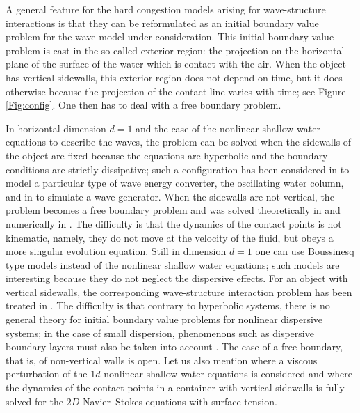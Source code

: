 \documentclass[11pt]{article}
\theoremstyle{definition}
\begin{document}
A general feature for the hard congestion models arising for wave-structure interactions is that
they can be reformulated as an initial boundary value problem for the wave model under consideration.
This initial boundary value problem is cast in the so-called exterior region:
the projection on the horizontal plane of the surface of the water which is contact with the air.
When the object has vertical sidewalls, this exterior region does not depend on time,
but it does otherwise because the projection of the contact line varies with time; see Figure \ref{Fig:config}.
One then has to deal with a free boundary problem.

In horizontal dimension $d=1$ and the case of the nonlinear shallow water equations to describe the waves,
the problem can be solved when the sidewalls of the object are fixed because the equations are hyperbolic and the boundary conditions are strictly dissipative;
such a configuration has been considered in \cite{BocchiHeVergara} to model a particular type of wave energy converter, the oscillating water column,
and in \cite{SuTucsnak} to simulate a wave generator.
When the sidewalls are not vertical,
the problem becomes a free boundary problem and was solved theoretically in \cite{IguchiLannes2021} and numerically in \cite{HaidarMarcheVilar}.
The difficulty is that the dynamics of the contact points is not kinematic, namely, they do not move at the velocity of the fluid,
but obeys a more singular evolution equation.
Still in dimension $d=1$ one can use Boussinesq type models instead of the nonlinear shallow water equations;
such models are interesting because they do not neglect the dispersive effects.
For an object with vertical sidewalls,
the corresponding wave-structure interaction problem has been treated in \cite{BreschLannesMetivier,BeckLannes,BeckLannesWeynans}.
The difficulty is that contrary to hyperbolic systems, there is no general theory for initial boundary value problems for nonlinear dispersive systems;
in the case of small dispersion, phenomenons such as dispersive boundary layers must also be taken into account \cite{BreschLannesMetivier}.
The case of a free boundary, that is, of non-vertical walls is open.
Let us also mention \cite{MSTT} where a viscous perturbation of the $1d$ nonlinear shallow water equations is considered and \cite{GuoTice,GuoTiceZheng}
where the dynamics of the contact points in a container with vertical sidewalls is fully solved for the $2D$ Navier--Stokes equations with surface tension.
\end{document}
